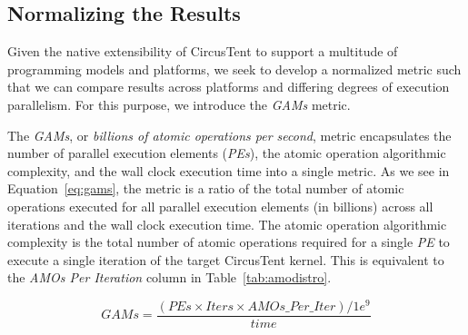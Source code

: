 \subsection{Normalizing the Results}
\label{subsec:normalizingtheresults}

Given the native extensibility of CircusTent to support a multitude of programming models and platforms, we seek to develop a normalized metric such that we can compare results across platforms and differing degrees of execution parallelism.
For this purpose, we introduce the \textit{GAMs} metric.  

The \textit{GAMs}, or \textit{billions of atomic operations per second}, metric encapsulates the number of parallel execution elements (\textit{PEs}), the atomic operation algorithmic complexity, and the wall clock execution time into a single metric.
As we see in Equation~\ref{eq:gams}, the metric is a ratio of the total number of atomic operations executed for all parallel execution elements (in billions) across all iterations and the wall clock execution time.
The atomic operation algorithmic complexity is the total number of atomic operations required for a single \textit{PE} to execute a single iteration of the target CircusTent kernel.
This is equivalent to the \textit{AMOs Per Iteration} column in Table~\ref{tab:amodistro}.  

\begin{equation}
\label{eq:gams}
  GAMs = \frac{(PEs \times Iters \times AMOs\_Per\_Iter)/1e^{9}}{time}
\end{equation}
